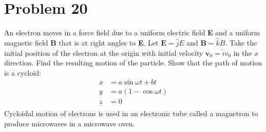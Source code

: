 \documentclass[]{article}
\newcommand{\bd}{\textbf}
\begin{document}
	\section{Problem 20}
	
	An electron moves in a force field due to a uniform electric field \bd{E} and a uniform magnetic field \bd{B} that is at right angles to \bd{E}. Let $ \bd{E} = \hat{j}E $ and  $ \bd{B} = \hat{k}B $. Take the initial position of the electron at the origin with initial velocity $ \bd{v}_0 = \hat{i}v_0 $ in the $ x $ direction. Find the resulting motion of the particle. Show that the path of motion is a cycloid:
	\begin{equation}
		\begin{split}
			x &= a\sin \omega t + bt \\
			y &= a(1 - \cos \omega t) \\
			z &= 0 \\
		\end{split}
	\end{equation}
	Cycloidal motion of electrons is used in an electronic tube called a magnetron to produce microwaves in a microwave oven. \\
	
\end{document}
